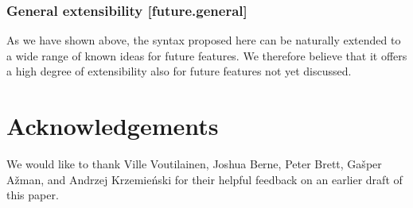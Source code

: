 \subsubsection{General extensibility  [future.general]}

As we have shown above, the syntax proposed here can be naturally extended to a wide range of known ideas for future features. We therefore believe that it offers a high degree of extensibility also for future features not yet discussed.

\label{subsec:future}



\section*{Acknowledgements}

We would like to thank Ville Voutilainen, Joshua Berne, Peter Brett, Ga\v sper A\v zman, and Andrzej Krzemie\' nski for their helpful feedback on an earlier draft of this paper.

\renewcommand{\bibname}{References}




